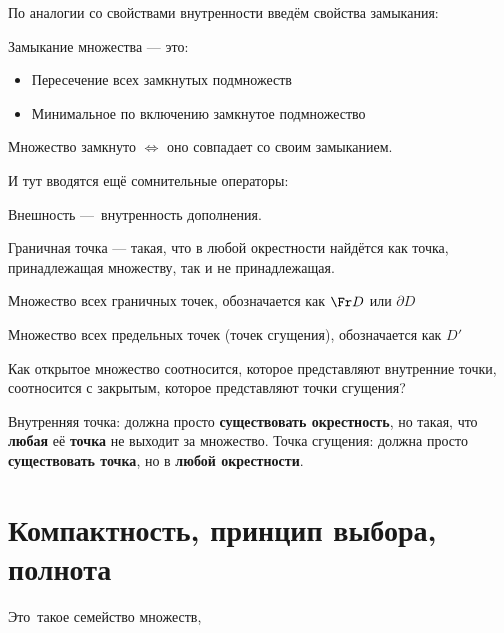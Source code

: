 \documentclass[12pt, a4paper]{article}
\begin{document}
  По аналогии со свойствами внутренности введём свойства замыкания:
  \begin{property}
    Замыкание множества — это:
    
    \begin{itemize}
      \item Пересечение всех замкнутых подмножеств
      \item Минимальное по включению замкнутое подмножество
    \end{itemize}
  \end{property}

  \begin{note}
    Множество замкнуто $\Longleftrightarrow$ оно совпадает со своим замыканием.
  \end{note}


  И тут вводятся ещё сомнительные операторы:

  \begin{definition}
    Внешность — внутренность дополнения.
  \end{definition}

  \begin{definition}
    Граничная точка — такая, что в любой окрестности найдётся как точка, 
    принадлежащая множеству, так и не принадлежащая.
  \end{definition}

  \begin{definition}
    Множество всех граничных точек, обозначается как $\Fr D$ или $\partial D$
  \end{definition}


  \begin{definition}
    Множество всех предельных точек (точек сгущения), обозначается как $D'$
  \end{definition}





  \begin{note}
    Как открытое множество соотносится, которое представляют внутренние точки, 
    соотносится с закрытым, которое представляют точки сгущения?
    
    Внутренняя точка: должна просто \textbf{существовать окрестность}, но такая, что \textbf{любая} её \textbf{точка} не выходит за множество. 
    Точка сгущения: должна просто \textbf{существовать точка}, но в \textbf{любой окрестности}.
  \end{note}


  \section{Компактность, принцип выбора, полнота}

  \begin{definition}
    [Покрытие] 
    Это такое семейство множеств, 
  \end{definition}

  
\end{document}
